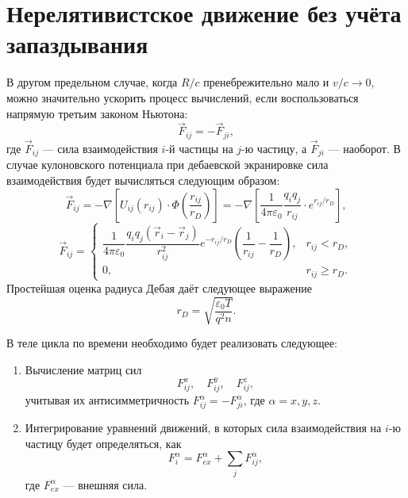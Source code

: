 \section{Нерелятивистское движение без учёта запаздывания}

В другом предельном случае, когда $R/c$ пренебрежительно мало и $v/c \to 0$, можно значительно ускорить процесс вычислений, если воспользоваться напрямую третьим законом Ньютона:
\begin{equation}
\vec{F}_{ij} = - \vec{F}_{ji},
\end{equation}
где $\vec{F}_{ij}$ --- сила взаимодействия $i$-й частицы на $j$-ю частицу, а $\vec{F}_{ji}$ --- наоборот.  В случае кулоновского потенциала при дебаевской экранировке сила взаимодействия будет вычисляться следующим образом:
\begin{equation*}
	\vec{F}_{ij} = - \nabla \left[U_{ij} (r_{ij}) \cdot \Phi \left( \frac{r_{ij}}{r_D} \right)\right] = - \nabla \left[ \frac{1}{4 \pi \varepsilon_0} \frac{q_i q_j}{r_{ij}} \cdot e^{r_{ij}/r_D} \right],
\end{equation*}
\begin{equation}
	\vec{F}_{ij} = 
	\begin{cases}
		\dfrac{1}{4 \pi \varepsilon_0} \dfrac{q_iq_j \left( \vec{r}_i - \vec{r}_j \right)}{r_{ij}^2} e^{-r_{ij}/r_D} \left( \dfrac{1}{r_{ij}} - \dfrac{1}{r_D} \right), & r_{ij} < r_D, \\
		0, & r_{ij} \geq r_D.
	\end{cases}
	\label{eq:force_with_debai}
\end{equation}
Простейшая оценка радиуса Дебая даёт следующее выражение
\begin{equation}
	r_D = \sqrt{\frac{\varepsilon_0 T}{q^2n}}.
	\label{eq:debai_analitic}
\end{equation}

В теле цикла по времени необходимо будет реализовать следующее:
\begin{enumerate}
\item Вычисление матриц сил
\begin{equation}
F^x_{ij}, \quad F^y_{ij}, \quad F^z_{ij},
\end{equation}
учитывая их антисимметричность $F^{\alpha}_{ij} = - F^{\alpha}_{ji}$, где $\alpha = x,y,z$.
\item Интегрирование уравнений движений, в которых сила взаимодействия на $i$-ю частицу будет определяться, как
\begin{equation}
F^{\alpha}_i = F^{\alpha}_{ex} + \sum\limits_{j} F^{\alpha}_{ij},
\end{equation}
где $F^{\alpha}_{ex}$ --- внешняя сила.
\end{enumerate}







